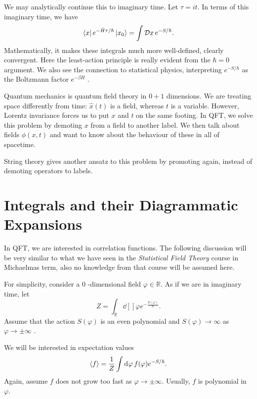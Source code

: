 
We may analytically continue this to imaginary time.
Let $\tau = i t$. In terms of this imaginary time, we have
 \begin{equation}
  \bra{x} e^{- \hat{H} \tau / \hbar} \ket{x_0} = \int \mathop{\mathcal{D} x} e^{-S / \hbar}.
\end{equation}
Mathematically, it makes these integrals much more well-defined, clearly convergent.
Here the least-action principle is really evident from  the $\hbar = 0$ argument.
We also see the connection to statistical physics, interpreting  $e^{-S / \hbar}$  as the Boltzmann factor $e^{-\beta H}$ .

Quantum mechanics is quantum field theory in $0 + 1$  dimensions.
We are treating space differently from time: $\hat{x}(t)$  is a field, whereas $t$  is a variable.
However, Lorentz invariance forces us to put $x$  and $t$  on the same footing.
In QFT, we solve this problem by demoting $x$ from a field to another label. We then talk about fields $\phi(x, t)$ and want to know about the behaviour of these in all of spacetime.
\begin{leftbar}
  String theory gives another ansatz to this problem by promoting again, instead of demoting operators to labels.
\end{leftbar}

\section{Integrals and their Diagrammatic Expansions}%
\label{sec:integrals_and_their_diagrammatic_expansions}

In QFT, we are interested in correlation functions.
The following discussion will be very similar to what we have seen in the \emph{Statistical Field Theory} course in Michaelmas term, also no knowledge from that course will be assumed here.

For simplicity, consider a $0$ -dimensional field $\varphi \in \mathbb{R}$. As if we are in imaginary time, let
\begin{equation}
  Z = \int_{\mathbb{R}} \dd[]{\varphi} e^{- \frac{S(\varphi)}{\hbar}}.
\end{equation} 
Assume that the action $S(\varphi)$  is an even polynomial and  $S(\varphi) \to \infty$  as $\varphi \to \pm \infty$ .

We will be interested in expectation values
\begin{equation}
  \expectationvalue{f} = \frac{1}{Z} \int \dd[]{\varphi} f(\varphi) e^{-S / \hbar}.
\end{equation}
Again, assume $f$ does not grow too fast as $\varphi \to \pm \infty$. Usually, $f$ is polynomial in $\varphi$.

